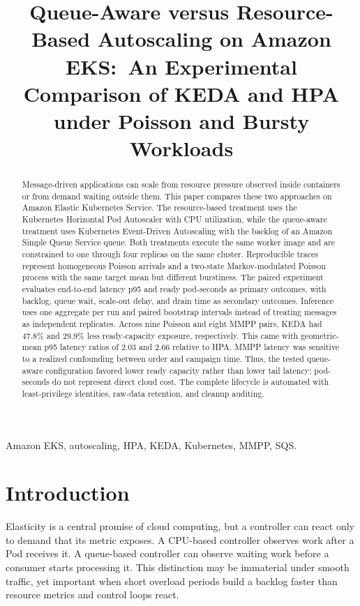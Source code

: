 \documentclass[conference]{IEEEtran}
\title{Queue-Aware versus Resource-Based Autoscaling on Amazon EKS:\
An Experimental Comparison of KEDA and HPA under Poisson and Bursty Workloads}
\author{\IEEEauthorblockN{Lucas Melo Rocha}
\IEEEauthorblockA{NUSP 13680400\\
PSI5120 -- Topics in Cloud Computing\\
Polytechnic School, University of S\~ao Paulo}}
\begin{document}
\maketitle

\begin{abstract}
Message-driven applications can scale from resource pressure observed inside
containers or from demand waiting outside them. This paper compares these two
approaches on Amazon Elastic Kubernetes Service. The resource-based treatment
uses the Kubernetes Horizontal Pod Autoscaler with CPU utilization, while the
queue-aware treatment uses Kubernetes Event-Driven Autoscaling with the backlog
of an Amazon Simple Queue Service queue. Both treatments execute the same
worker image and are constrained to one through four replicas on the same
cluster. Reproducible traces represent homogeneous Poisson arrivals and a
two-state Markov-modulated Poisson process with the same target mean but
different burstiness. The paired experiment evaluates end-to-end latency p95
and ready pod-seconds as primary outcomes, with backlog, queue wait, scale-out
delay, and drain time as secondary outcomes. Inference uses one aggregate per
run and paired bootstrap intervals instead of treating messages as independent
replicates. Across nine Poisson and eight MMPP pairs, KEDA had 47.8\% and 29.9\%
less ready-capacity exposure, respectively. This came with geometric-mean p95
latency ratios of 2.03 and 2.66 relative to HPA. MMPP latency was sensitive to a
realized confounding between order and campaign time. Thus, the tested
queue-aware configuration favored lower ready capacity rather than lower tail
latency; pod-seconds do not represent direct cloud cost. The complete lifecycle
is automated with least-privilege identities, raw-data retention, and cleanup
auditing.
\end{abstract}

\begin{IEEEkeywords}
Amazon EKS, autoscaling, HPA, KEDA, Kubernetes, MMPP, SQS.
\end{IEEEkeywords}

\section{Introduction}

Elasticity is a central promise of cloud computing, but a controller can react
only to demand that its metric exposes. A CPU-based controller observes work
after a Pod receives it. A queue-based controller can observe waiting work
before a consumer starts processing it. This distinction may be immaterial
under smooth traffic, yet important when short overload periods build a backlog
faster than resource metrics and control loops react.
\end{document}
